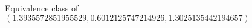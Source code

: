 \documentclass[preview]{standalone}
\begin{document}
\begin{center}
Equivalence class of $(1.3935572851955529, 0.6012125747214926, 1.3025135442194657)$
\end{center}
\end{document}
